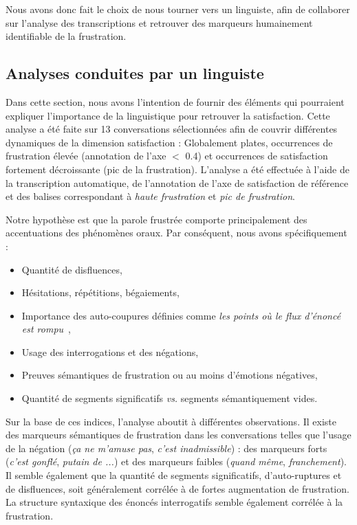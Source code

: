 

Nous avons donc fait le choix de nous tourner vers un linguiste, afin de collaborer sur l'analyse des transcriptions et retrouver des marqueurs humainement identifiable de la frustration.


\subsection{Analyses conduites par un linguiste}
Dans cette section, nous avons l'intention de fournir des éléments qui pourraient expliquer l'importance de la linguistique pour retrouver la satisfaction.
Cette analyse a été faite sur 13 conversations sélectionnées afin de couvrir différentes dynamiques de la dimension satisfaction : Globalement plates, occurrences de frustration élevée (annotation de l'axe $<$ 0.4) et occurrences de satisfaction fortement décroissante (pic de la frustration).
L'analyse a été effectuée à l'aide de la transcription automatique, de l'annotation de l'axe de satisfaction de référence et des balises correspondant à \textit{haute frustration} et \textit{pic de frustration}.

Notre hypothèse est que la parole frustrée comporte principalement  des accentuations des phénomènes oraux.
Par conséquent, nous avons spécifiquement :
\begin{itemize}
    \item Quantité de disfluences,
    \item Hésitations, répétitions, bégaiements,
    \item Importance des auto-coupures définies comme \textit{les points où le flux d'énoncé est rompu}~\cite{Pallaud2019},
    \item Usage des interrogations et des négations,
    \item Preuves sémantiques de frustration ou au moins d'émotions négatives,
    \item Quantité de segments significatifs \textit{vs.} segments sémantiquement vides.
\end{itemize}

Sur la base de ces indices, l'analyse aboutit à différentes observations.
Il existe des marqueurs sémantiques de frustration dans les conversations telles que l'usage de la négation (\textit{ça ne m'amuse pas}, \textit{c'est inadmissible}) : des marqueurs forts (\textit{c'est gonflé}, \textit{putain de ...}) et des marqueurs faibles (\textit{quand même}, \textit{franchement}).
Il semble également que la quantité de segments significatifs, d'auto-ruptures et de disfluences, soit généralement corrélée à de fortes augmentation de frustration. La structure syntaxique des énoncés interrogatifs semble également corrélée à la frustration.

